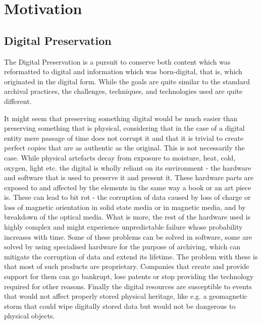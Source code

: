 \clearpage %

\section{Motivation}

\subsection{Digital Preservation}

The Digital Preservation is a pursuit to conserve both content which was
reformatted to digital and information which was born-digital, that is, which
originated in the digital form. While the goals are quite similar to the
standard archival practices, the challenges, techniques, and technologies used
are quite different.

It might seem that preserving something digital would be much easier than
preserving something that is physical, considering that in the case of
a digital entity mere passage of time does not corrupt it and that it is
trivial to create perfect copies that are as authentic as the original. This is
not necessarily the case. While physical artefacts decay from exposure to
moisture, heat, cold, oxygen, light etc. the digital is wholly reliant on its
environment - the hardware and software that is used to preserve it and present
it. These hardware parts are exposed to and affected by the elements in the
same way a book or an art piece is. These can lead to bit rot - the corruption
of data caused by loss of charge or loss of magnetic orientation in solid state
media or in magnetic media, and by breakdown of the optical media. What is
more, the rest of the hardware used is highly complex and might experience
unpredictable failure whose probability increases with time. Some of these
problems can be solved in software, some are solved by using specialised
hardware for the purpose of archiving, which can mitigate the corruption of
data and extend its lifetime. The problem with these is that most of such
products are proprietary. Companies that create and provide support for them
can go bankrupt, lose patents or stop providing the technology required for
other reasons. Finally the digital resources are susceptible to events that
would not affect properly stored physical heritage, like e.g. a geomagnetic
storm that could wipe digitally stored data but would not be dangerous to
physical objects.

